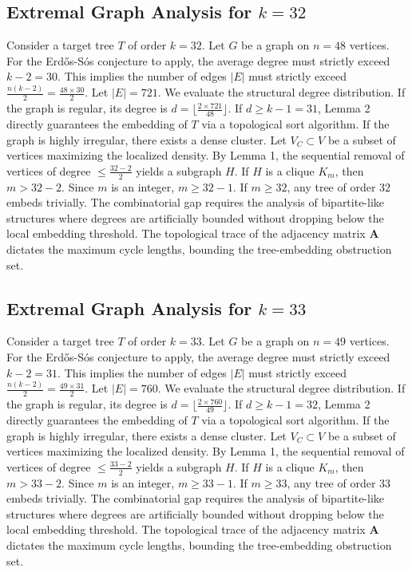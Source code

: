 \documentclass[11pt,a4paper]{article}
\begin{document}
\subsection{Extremal Graph Analysis for $k=32$}
Consider a target tree $T$ of order $k=32$.
Let $G$ be a graph on $n=48$ vertices.
For the Erd\H{o}s-S\'os conjecture to apply, the average degree must strictly exceed $k-2 = 30$.
This implies the number of edges $|E|$ must strictly exceed $\frac{n(k-2)}{2} = \frac{48 \times 30}{2}$.
Let $|E| = 721$.
We evaluate the structural degree distribution. If the graph is regular, its degree is $d = \lfloor \frac{2 \times 721}{48} \rfloor$.
If $d \geq k-1 = 31$, Lemma 2 directly guarantees the embedding of $T$ via a topological sort algorithm.
If the graph is highly irregular, there exists a dense cluster. Let $V_C \subset V$ be a subset of vertices maximizing the localized density.
By Lemma 1, the sequential removal of vertices of degree $\leq \frac{32-2}{2}$ yields a subgraph $H$.
If $H$ is a clique $K_{m}$, then $m > 32-2$. Since $m$ is an integer, $m \geq 32-1$. If $m \geq 32$, any tree of order $32$ embeds trivially.
The combinatorial gap requires the analysis of bipartite-like structures where degrees are artificially bounded without dropping below the local embedding threshold. The topological trace of the adjacency matrix $\mathbf{A}$ dictates the maximum cycle lengths, bounding the tree-embedding obstruction set.


\subsection{Extremal Graph Analysis for $k=33$}
Consider a target tree $T$ of order $k=33$.
Let $G$ be a graph on $n=49$ vertices.
For the Erd\H{o}s-S\'os conjecture to apply, the average degree must strictly exceed $k-2 = 31$.
This implies the number of edges $|E|$ must strictly exceed $\frac{n(k-2)}{2} = \frac{49 \times 31}{2}$.
Let $|E| = 760$.
We evaluate the structural degree distribution. If the graph is regular, its degree is $d = \lfloor \frac{2 \times 760}{49} \rfloor$.
If $d \geq k-1 = 32$, Lemma 2 directly guarantees the embedding of $T$ via a topological sort algorithm.
If the graph is highly irregular, there exists a dense cluster. Let $V_C \subset V$ be a subset of vertices maximizing the localized density.
By Lemma 1, the sequential removal of vertices of degree $\leq \frac{33-2}{2}$ yields a subgraph $H$.
If $H$ is a clique $K_{m}$, then $m > 33-2$. Since $m$ is an integer, $m \geq 33-1$. If $m \geq 33$, any tree of order $33$ embeds trivially.
The combinatorial gap requires the analysis of bipartite-like structures where degrees are artificially bounded without dropping below the local embedding threshold. The topological trace of the adjacency matrix $\mathbf{A}$ dictates the maximum cycle lengths, bounding the tree-embedding obstruction set.
\end{document}
